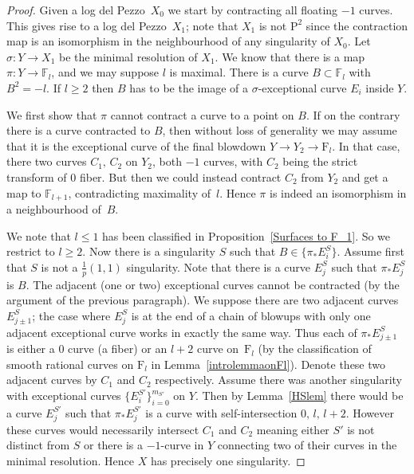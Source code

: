 \documentclass[11pt]{amsbook}
\theoremstyle{plain}
\newcommand{\ldp}{log del Pezzo}
\newcommand{\mb}[1]{\mathbb{#1}}
\newcommand{\F}{\mathrm{F}}
\renewcommand{\P}{\mathrm{P}}
\begin{document}
\begin{proof}
Given a \ldp\ $X_0$ we start by contracting all floating $-1$ curves. This gives rise to a \ldp\ $X_1$; note that $X_1$ is not $\P^2$ since the contraction map is an isomorphism in the neighbourhood of any singularity of $X_0$. Let $\sigma\colon Y\rightarrow X_1$ be the minimal resolution of $X_1$. We know that there is a map $\pi \colon Y \rightarrow \mathbb{F}_l$, and we may suppose $l$ is maximal.
There is a curve $B \subset \mathbb{F}_l$ with $B^2 = -l$. 
If $l\ge2$ then $B$ has to be the image of a $\sigma$-exceptional curve $E_i$ inside $Y$.

We first show that $\pi$ cannot contract a curve to a point on $B$.
If on the contrary there is a curve contracted to $B$, then
without loss of generality we may assume that it is the exceptional curve of the final blowdown $Y\rightarrow Y_2\rightarrow\F_l$. In that case, there two curves $C_1, \, C_2$ on $Y_2$, both $-1$ curves, with $C_2$ being the strict transform of $0$ fiber. But then we could instead contract $C_2$ from $Y_2$ and get a map to $\mb{F}_{l+1}$, contradicting maximality of~$l$. 
Hence $\pi$ is indeed an isomorphism in a neighbourhood of~$B$.


We note that  $l \leq 1$ has been classified in Proposition~\ref{Surfaces to F_1}. So we restrict to $l \geq 2$. Now there is a singularity $S$ such that $B \in \{ \pi_*E_i^S \}$. Assume first that $S$ is not a $\frac{1}{p}(1,1)$ singularity. Note that there is a curve $E_j^S$ such that $\pi_* E_j^S$ is $B$. The adjacent (one or two) exceptional curves cannot be contracted (by the argument of the previous paragraph). We suppose there are two adjacent curves $E_{j\pm 1}^S$; the case where $E_j^S$ is at the end of a chain of blowups with only one adjacent exceptional curve works in exactly the same way. Thus each of $\pi_*E_{j\pm 1}^S$ is either a $0$ curve (a fiber) or an $l+2$ curve on~$\F_l$ (by the classification of smooth rational curves on $\F_l$ in Lemma~\ref{introlemmaonFl}).
Denote these two adjacent curves by $C_1$ and $C_2$ respectively. Assume there was another singularity with exceptional curves $\{ E_i^{S'} \}_{i=0}^{m_{S'}} $ on $Y$. Then by Lemma~\ref{HSlem} there would be a curve $E_j^{S'}$ such that $\pi_* E_j^{S'}$ is a curve with self-intersection $0, \,  l,\,  l+2$. However these curves would necessarily intersect $C_1$ and $C_2$ meaning either $S'$ is not distinct from $S$ or there is a $-1$-curve in $Y$ connecting two of their curves in the minimal resolution. Hence $X$ has precisely one singularity. 


\end{proof}
\end{document}
